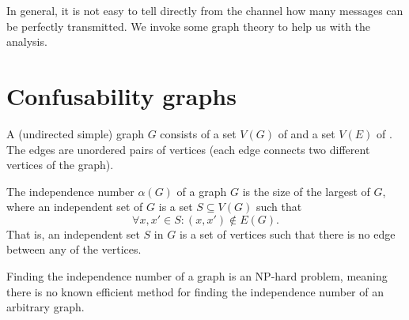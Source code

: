 In general, it is not easy to tell directly from the channel how many messages can be perfectly transmitted. We invoke some graph theory to help us with the analysis.

\section{Confusability graphs}

\begin{definition}[Graph]
A (undirected simple) graph $G$ consists of a set $V(G)$ of  and a set $V(E)$ of . The edges are unordered pairs of vertices (each edge connects two different vertices of the graph).
\end{definition}

\begin{definition}
The independence number $\alpha(G)$ of a graph $G$ is the size of the largest  of $G$, where an independent set of $G$ is a set $S \subseteq V(G)$ such that
\[
\forall x, x' \in S: (x,x') \not\in E(G).
\]
That is, an independent set $S$ in $G$ is a set of vertices such that there is no edge between any of the vertices.
\end{definition}
Finding the independence number of a graph is an NP-hard problem, meaning there is no known efficient method for finding the independence number of an arbitrary graph.

